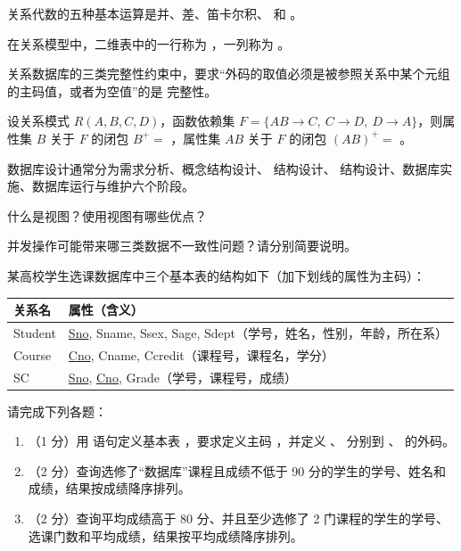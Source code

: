 \documentclass[a4paper,11pt]{article}
\begin{document}
\q 关系代数的五种基本运算是并、差、笛卡尔积、\fillblank{} 和 \fillblank{}。

\q 在关系模型中，二维表中的一行称为 \fillblank{}，一列称为 \fillblank{}。

\q 关系数据库的三类完整性约束中，要求“外码的取值必须是被参照关系中某个元组的主码值，或者为空值”的是 \fillblank{} 完整性。

\q 设关系模式 $R(A,B,C,D)$，函数依赖集 $F=\{AB\to C,\ C\to D,\ D\to A\}$，则属性集 $B$ 关于 $F$ 的闭包 $B^{+}=$ \fillblank{}，属性集 $AB$ 关于 $F$ 的闭包 $(AB)^{+}=$ \fillblank{}。

\q 数据库设计通常分为需求分析、概念结构设计、\fillblank{} 结构设计、\fillblank{} 结构设计、数据库实施、数据库运行与维护六个阶段。


\q 什么是视图？使用视图有哪些优点？
\anslines{3.2cm}

\q 并发操作可能带来哪三类数据不一致性问题？请分别简要说明。
\anslines{3.2cm}


\q 某高校学生选课数据库中三个基本表的结构如下（加下划线的属性为主码）：

\begin{center}
\begin{tabular}{ll}
\toprule
关系名 & 属性（含义） \\
\midrule
Student & \underline{Sno}, Sname, Ssex, Sage, Sdept（学号，姓名，性别，年龄，所在系） \\
Course & \underline{Cno}, Cname, Ccredit（课程号，课程名，学分） \\
SC & \underline{Sno}, \underline{Cno}, Grade（学号，课程号，成绩） \\
\bottomrule
\end{tabular}
\end{center}

请完成下列各题：
\begin{enumerate}[label=（\arabic*）, leftmargin=2.4em, itemsep=1pt]
  \item（1 分）用  语句定义基本表 ，要求定义主码 ，并定义 、 分别到 、 的外码。
  \item（2 分）查询选修了“数据库”课程且成绩不低于 90 分的学生的学号、姓名和成绩，结果按成绩降序排列。
  \item（2 分）查询平均成绩高于 80 分、并且至少选修了 2 门课程的学生的学号、选课门数和平均成绩，结果按平均成绩降序排列。
\end{enumerate}
\anslines{5.2cm}
\end{document}
